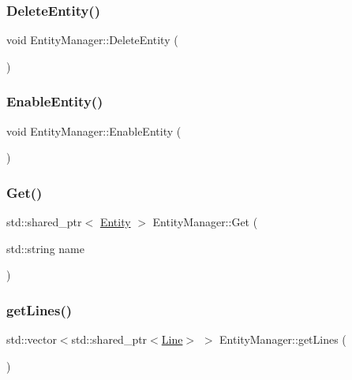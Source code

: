 \mbox{\label{classEntityManager_a9164014cb9331406a659d5ec61560f9d}} 
\subsubsection{\texorpdfstring{Delete\+Entity()}{DeleteEntity()}}
{\footnotesize\ttfamily void Entity\+Manager\+::\+Delete\+Entity (\begin{DoxyParamCaption}{ }\end{DoxyParamCaption})}

\mbox{\label{classEntityManager_a53286b6a783436258be418ec354dc584}} 
\subsubsection{\texorpdfstring{Enable\+Entity()}{EnableEntity()}}
{\footnotesize\ttfamily void Entity\+Manager\+::\+Enable\+Entity (\begin{DoxyParamCaption}{ }\end{DoxyParamCaption})}

\mbox{\label{classEntityManager_a8ece29270f575248ad03fad82f10b30b}} 
\subsubsection{\texorpdfstring{Get()}{Get()}}
{\footnotesize\ttfamily std\+::shared\+\_\+ptr$<$ \hyperlink{classEntity}{Entity} $>$ Entity\+Manager\+::\+Get (\begin{DoxyParamCaption}\item[{std\+::string}]{name }\end{DoxyParamCaption})}

\mbox{\label{classEntityManager_a049eb8f4a36e91fe1b85d3fc8c7ef4e7}} 
\subsubsection{\texorpdfstring{get\+Lines()}{getLines()}}
{\footnotesize\ttfamily std\+::vector$<$std\+::shared\+\_\+ptr$<$\hyperlink{classLine}{Line}$>$ $>$ Entity\+Manager\+::get\+Lines (\begin{DoxyParamCaption}{ }\end{DoxyParamCaption})\hspace{0.3cm}{\ttfamily [inline]}}

